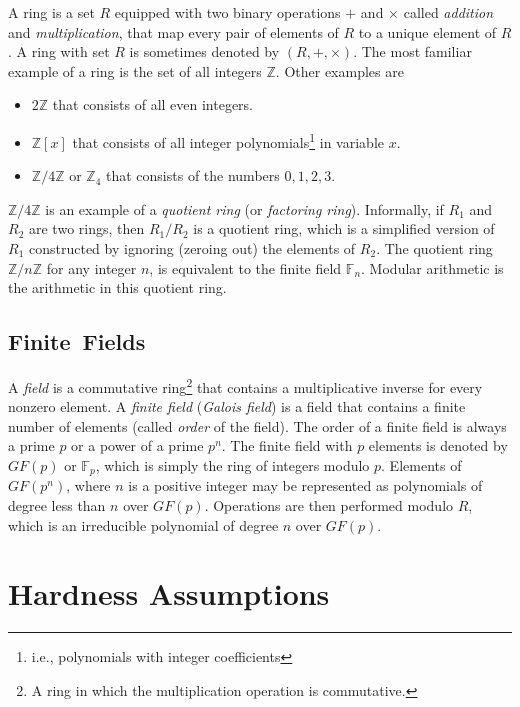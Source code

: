 \documentclass[10pt]{article}
\theoremstyle{plain}
\begin{document}
A ring is a set $R$ equipped with two binary operations $+$ and
$\times$ called \emph{addition} and \emph{multiplication}, that map
every pair of elements of $R$ to a unique element of $R$. A ring
with set $R$ is sometimes denoted by $(R,+,\times)$. The most familiar
example of a ring is the set of all integers $\mathbb{Z}$. Other
examples are 
\begin{itemize}
	\item $2\mathbb{Z}$ that consists of all even integers. 
	\item $\mathbb{Z}[x]$ that consists of all integer polynomials\footnote{i.e., polynomials with integer coefficients}
	in variable $x$. 
	\item $\mathbb{Z}/4\mathbb{Z}$ or $\mathbb{Z}_{4}$ that consists of the
	numbers $0,1,2,3$. 
\end{itemize}
$\mathbb{Z}/4\mathbb{Z}$ is an example of a \emph{quotient ring}
(or \emph{factoring ring}). Informally, if $R_{1}$ and $R_{2}$ are
two rings, then $R_{1}/R_{2}$ is a quotient ring, which is a simplified
version of $R_{1}$ constructed by ignoring (zeroing out) the elements
of $R_{2}$. The quotient ring $\mathbb{Z}/n\mathbb{Z}$ for any integer
$n$, is equivalent to the finite field $\mathbb{F}_{n}$. Modular
arithmetic is the arithmetic in this quotient ring.

\subsection{Finite~Fields}

A \emph{field} is a commutative ring\footnote{A ring in which the multiplication operation is commutative.}
that contains a multiplicative inverse for every nonzero element.
A \emph{finite field} (\emph{Galois field}) is a field that contains
a finite number of elements (called \emph{order} of the field). The
order of a finite field is always a prime $p$ or a power of a prime
$p^{n}$. The finite field with $p$ elements is denoted by $GF(p)$
or $\mathbb{F}_{p}$, which is simply the ring of integers modulo
$p$. Elements of $GF(p^{n})$, where $n$ is a positive integer may
be represented as polynomials of degree less than $n$ over $GF(p)$.
Operations are then performed modulo $R$, which is an irreducible
polynomial of degree $n$ over $GF(p)$.

\section{Hardness Assumptions}
\end{document}
